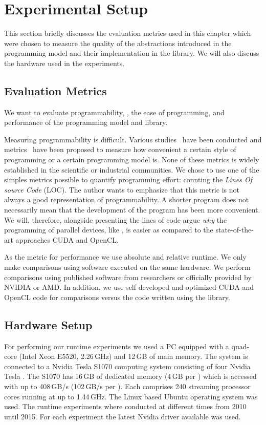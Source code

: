 \section{Experimental Setup}
\label{sec:skelcl:experimental_setup}
This section briefly discusses the evaluation metrics used in this chapter which were chosen to measure the quality of the abstractions introduced in the \SkelCL programming model and their implementation in the \SkelCL library.
We will also discuss the hardware used in the experiments.


\subsection{Evaluation Metrics}
We want to evaluate programmability, \ie, the ease of programming, and performance of the \SkelCL programming model and library.

Measuring programmability is difficult.
Various studies~\cite{HochsteinCSAB2005,HochsteinBVG2008} have been conducted and metrics~\cite{VanderwielNL1997} have been proposed to measure how convenient a certain style of programming or a certain programming model is.
None of these metrics is widely established in the scientific or industrial communities.
We chose to use one of the simples metrics possible to quantify programming effort: counting the \emph{Lines Of source Code} (LOC).
The author wants to emphasize that this metric is not always a good representation of programmability.
A shorter program does not necessarily mean that the development of the program has been more convenient.
We will, therefore, alongside presenting the lines of code argue \emph{why} the programming of parallel devices, like \GPUs, is easier as compared to the state-of-the-art approaches CUDA and OpenCL.

As the metric for performance we use absolute and relative runtime.
We only make comparisons using software executed on the same hardware.
We perform comparisons using published software from researchers or officially provided by NVIDIA or AMD.
In addition, we use self developed and optimized CUDA and OpenCL code for comparisons versus the code written using the \SkelCL library.

\subsection{Hardware Setup}
For performing our runtime experiments we used a PC equipped with a quad-core \CPU (Intel Xeon E5520, 2.26\,GHz) and 12\,GB of main memory.
The system is connected to a Nvidia Tesla S1070 computing system consisting of four Nvidia Tesla \GPUs.
The S1070 has 16\,GB of dedicated memory (4\,GB per \GPU) which is accessed with up to 408\,GB/s (102\,GB/s per \GPU).
Each \GPU comprises 240 streaming processor cores running at up to 1.44\,GHz.
The Linux based Ubuntu operating system was used.
The runtime experiments where conducted at different times from 2010 until 2015.
For each experiment the latest Nvidia \GPU driver available was used.

